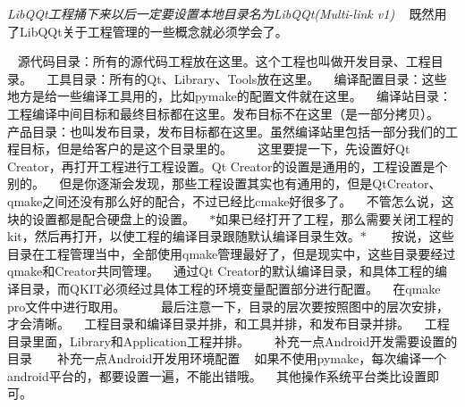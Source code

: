 {\itshape Lib\+Q\+Qt工程捅下来以后一定要设置本地目录名为\+Lib\+Q\+Qt(Multi-\/link v1)} ~\newline
 既然用了\+Lib\+Q\+Qt关于工程管理的一些概念就必须学会了。 ~\newline


 ~\newline
源代码目录：所有的源代码工程放在这里。这个工程也叫做开发目录、工程目录。 ~\newline
工具目录：所有的\+Qt、\+Library、\+Tools放在这里。 ~\newline
编译配置目录：这些地方是给一些编译工具用的，比如pymake的配置文件就在这里。 ~\newline
编译站目录：工程编译中间目标和最终目标都在这里。发布目标不在这里（是一部分拷贝）。 ~\newline
产品目录：也叫发布目录，发布目标都在这里。虽然编译站里包括一部分我们的工程目标，但是给客户的是这个目录里的。 ~\newline
  ~\newline
这里要提一下，先设置好\+Qt Creator，再打开工程进行工程设置。\+Qt Creator的设置是通用的，工程设置是个别的。 ~\newline
但是你逐渐会发现，那些工程设置其实也有通用的，但是\+Qt\+Creator、qmake之间还没有那么好的配合，不过已经比cmake好很多了。 ~\newline
不管怎么说，这块的设置都是配合硬盘上的设置。 ~\newline
$\ast$如果已经打开了工程，那么需要关闭工程的kit，然后再打开，以使工程的编译目录跟随默认编译目录生效。$\ast$ ~\newline
  ~\newline
按说，这些目录在工程管理当中，全部使用qmake管理最好了，但是现实中，这些目录要经过qmake和\+Creator共同管理。 ~\newline
通过\+Qt Creator的默认编译目录，和具体工程的编译目录，而\+Q\+K\+I\+T必须经过具体工程的环境变量配置部分进行配置。 ~\newline
在qmake pro文件中进行取用。 ~\newline
  ~\newline
 ~\newline
 最后注意一下，目录的层次要按照图中的层次安排，才会清晰。 ~\newline
工程目录和编译目录并排，和工具并排，和发布目录并排。 ~\newline
工程目录里面，\+Library和\+Application工程并排。 ~\newline
  ~\newline
补充一点\+Android开发需要设置的目录 ~\newline
 ~\newline
补充一点\+Android开发用环境配置 ~\newline
如果不使用pymake，每次编译一个android平台的，都要设置一遍，不能出错哦。 ~\newline
其他操作系统平台类比设置即可。 ~\newline
